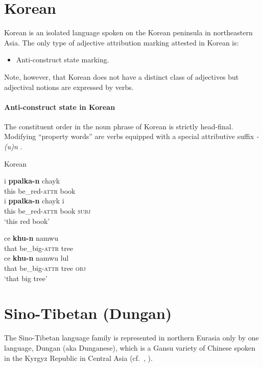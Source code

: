 \section{Korean}
Korean is an isolated language spoken on the Korean peninsula in northeastern Asia. The only type of adjective attribution marking attested in Korean is:
\begin{itemize}
\item Anti-construct state marking.
\end{itemize}
Note, however, that Korean does not have a distinct class of adjectives but adjectival notions are expressed by verbs.

\paragraph{Anti-construct state in Korean}
The constituent order in the noun phrase of Korean is strictly head-final. Modifying “property words” are verbs equipped with a special attributive suffix \textit{-(u)n} \citep{martin-etal1969}.
\begin{exe}
\ex \rm{Korean \citep[61]{chang1996}}
\begin{xlist}
\ex
\begin{xlist}
\ex
\gll	i \textbf{ppalka-n} chayk\\
	this be\_red-\textsc{attr} book\\
\ex	
\gll	i \textbf{ppalka-n} chayk i\\
	this be\_red-\textsc{attr} book \textsc{subj}\\
\glt	‘this red book’
\end{xlist}
\ex
\begin{xlist}
\ex	
\gll	ce \textbf{khu-n} namwu\\
	that be\_big-\textsc{attr} tree\\
\ex
\gll	ce \textbf{khu-n} namwu lul\\
	that be\_big-\textsc{attr} tree \textsc{obj}\\
\glt	‘that big tree’
\end{xlist}
\end{xlist}
\end{exe}

\section{Sino-Tibetan (Dungan)}\label{sinotibetan synchr}
The Sino-Tibetan language family is represented in northern Eurasia only by one language, Dungan (aka Dunganese), which is a Gansu variety of Chinese spoken in the Kyrgyz Republic in Central Asia (cf.~\citealt[85]{yuo2003}, \citealt{kalimov1968}).

